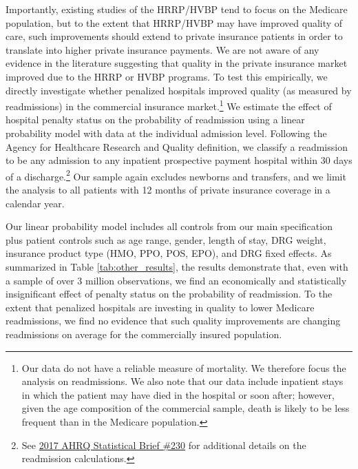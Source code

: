 \documentclass[12pt]{article}
\begin{document}
Importantly, existing studies of the HRRP/HVBP tend to focus on the Medicare population, but to the extent that HRRP/HVBP may have improved quality of care, such improvements should extend to private insurance patients in order to translate into higher private insurance payments. We are not aware of any evidence in the literature suggesting that quality in the private insurance market improved due to the HRRP or HVBP programs. To test this empirically, we directly investigate whether penalized hospitals improved quality (as measured by readmissions) in the commercial insurance market.\footnote{Our data do not have a reliable measure of mortality. We therefore focus the analysis on readmissions. We also note that our data include inpatient stays in which the patient may have died in the hospital or soon after; however, given the age composition of the commercial sample, death is likely to be less frequent than in the Medicare population.} We estimate the effect of hospital penalty status on the probability of readmission using a linear probability model with data at the individual admission level. Following the Agency for Healthcare Research and Quality definition, we classify a readmission to be any admission to any inpatient prospective payment hospital within 30 days of a discharge.\footnote{See \href{https://www.hcup-us.ahrq.gov/reports/statbriefs/sb230-7-Day-Versus-30-Day-Readmissions.jsp?utm_source=ahrq&utm_medium=en1&utm_term=&utm_content=1&utm_campaign=ahrq_en11_7_2017}{2017 AHRQ Statistical Brief \#230} for additional details on the readmission calculations.} Our sample again excludes newborns and transfers, and we limit the analysis to all patients with 12 months of private insurance coverage in a calendar year.

Our linear probability model includes all controls from our main specification plus patient controls such as age range, gender, length of stay, DRG weight, insurance product type (HMO, PPO, POS, EPO), and DRG fixed effects. As summarized in Table \ref{tab:other_results}, the results demonstrate that, even with a sample of over 3 million observations, we find an economically and statistically insignificant effect of penalty status on the probability of readmission. To the extent that penalized hospitals are investing in quality to lower Medicare readmissions, we find no evidence that such quality improvements are changing readmissions on average for the commercially insured population.
\end{document}
